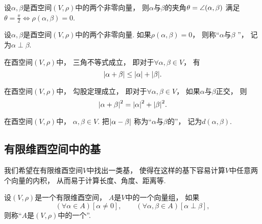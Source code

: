 \begin{property}
设\(\alpha,\beta\)是酉空间\((V,\rho)\)中的两个非零向量，
则\(\alpha\)与\(\beta\)的夹角\(\theta = \angle(\alpha,\beta)\)
满足\(\theta = \frac\pi2 \iff \rho(\alpha,\beta) = 0\).
\end{property}

\begin{definition}
设\(\alpha,\beta\)是酉空间\((V,\rho)\)中的两个非零向量.
如果\(\rho(\alpha,\beta) = 0\)，
则称“\(\alpha\)与\(\beta\) ”，
记为\(\alpha \perp \beta\).
\end{definition}

\begin{corollary}
在酉空间\((V,\rho)\)中，
三角不等式成立，
即对于\(\forall \alpha,\beta \in V\)，
有\begin{equation}
	\abs{\alpha+\beta} \leq \abs{\alpha} + \abs{\beta}.
\end{equation}
\end{corollary}

\begin{corollary}
在酉空间\((V,\rho)\)中，
勾股定理成立，
即对于\(\forall \alpha,\beta \in V\)，
如果\(\alpha\)与\(\beta\)正交，
则\begin{equation}
	\abs{\alpha+\beta}^2 = \abs{\alpha}^2 + \abs{\beta}^2.
\end{equation}
\end{corollary}

\begin{definition}
在酉空间\((V,\rho)\)中，
\(\alpha,\beta \in V\).
把\(\abs{\alpha-\beta}\)
称为“\(\alpha\)与\(\beta\)的”，
记为\(d(\alpha,\beta)\).
\end{definition}

\subsection{有限维酉空间中的基}
我们希望在有限维酉空间\(V\)中找出一类基，
使得在这样的基下容易计算\(V\)中任意两个向量的内积，
从而易于计算长度、角度、距离等.

\begin{definition}
设\((V,\rho)\)是一个有限维酉空间，
\(A\)是\(V\)中的一个向量组，
如果\begin{equation*}
	(\forall \alpha \in A)
	[\alpha\neq0],
	\qquad
	(\forall \alpha,\beta \in A)
	[\alpha \perp \beta],
\end{equation*}
则称“\(A\)是\((V,\rho)\)中的一个”.
\end{definition}

